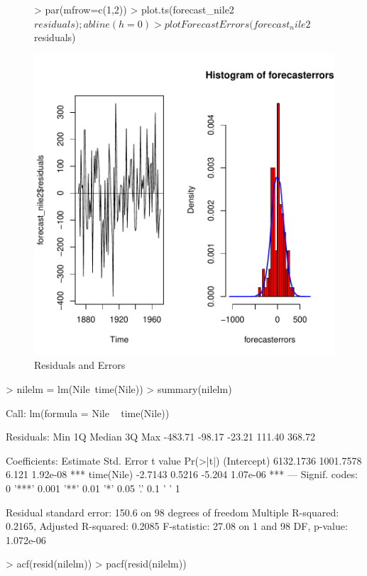 \documentclass[11pt, a4paper]{article} %
\begin{document}
\begin{figure}
\centering
\begin{Schunk}
\begin{Sinput}
> par(mfrow=c(1,2))
> plot.ts(forecast_nile2$residuals); abline(h=0)
> plotForecastErrors(forecast_nile2$residuals)
\end{Sinput}
\end{Schunk}
\includegraphics{alles-044}
\caption{Residuals and Errors}
\end{figure}

\begin{Schunk}
\begin{Sinput}
> nilelm = lm(Nile~time(Nile))
> summary(nilelm)
\end{Sinput}
\begin{Soutput}
Call:
lm(formula = Nile ~ time(Nile))

Residuals:
    Min      1Q  Median      3Q     Max 
-483.71  -98.17  -23.21  111.40  368.72 

Coefficients:
             Estimate Std. Error t value Pr(>|t|)    
(Intercept) 6132.1736  1001.7578   6.121 1.92e-08 ***
time(Nile)    -2.7143     0.5216  -5.204 1.07e-06 ***
---
Signif. codes:  
0 '***' 0.001 '**' 0.01 '*' 0.05 '.' 0.1 ' ' 1

Residual standard error: 150.6 on 98 degrees of freedom
Multiple R-squared:  0.2165,	Adjusted R-squared:  0.2085 
F-statistic: 27.08 on 1 and 98 DF,  p-value: 1.072e-06
\end{Soutput}
\begin{Sinput}
> acf(resid(nilelm))
> pacf(resid(nilelm))
\end{Sinput}
\end{Schunk}
\end{document}
